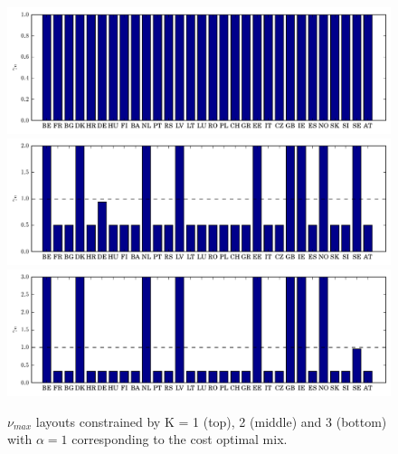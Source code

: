 \documentclass[a4paper, 12pt, sort&compress]{elsarticle}%
\newcommand{\chromowidth}{1.05 \columnwidth}
\begin{document}
\begin{figure}
  \centering
  \includegraphics[width = \chromowidth, center]{k=1cfMax}
  \includegraphics[width = \chromowidth, center]{k=2cfMax}
  \includegraphics[width = \chromowidth, center]{k=3cfMax}
  \caption{$\nu_{max}$ layouts constrained by K = 1 (top), 2
    (middle) and 3 (bottom) with $\alpha = 1$ corresponding to the cost optimal mix. }
  \label{fig:max}
\end{figure}
\end{document}
